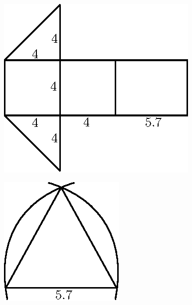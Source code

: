 \vskip 1cm

\begin{minipage}[b]{5.5cm}
\begin{figure}[H]
\centering
\includegraphics[scale=.9]{figure/fig_11.eps}
\caption{}\label{chap6-fig11}
\end{figure}
\end{minipage}
\qquad
\begin{minipage}[b]{4cm}
\begin{figure}[H]
\centering
\includegraphics[scale=.9]{figure/fig_12.eps}
\caption{}\label{chap6-fig12}
\end{figure}
\end{minipage}

